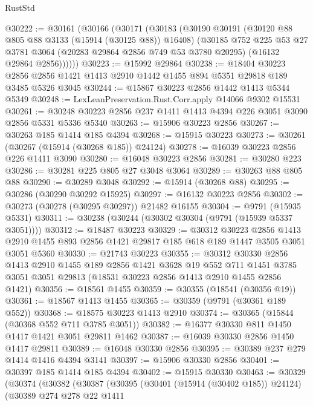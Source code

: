 \begin{lexlean}{RustStd}
\begin{coremodule}
@30222 := @30161
    (@30166
      (@30171
        (@30183
          (@30190
            @30191
            (@30120 @88 @805 @88 @3133 (@15914 (@30125 @88)) @16408)
            (@30185
              @752
              @225
              @53
              @27
              @3781
              @3064
              (@20283 @29864 @2856 @749 @53 @3780 @20295)
              (@16132 @29864 @2856))))))
@30223 := @15992 @29864
@30238 := @18404
    @30223
    @2856
    @2856
    @1421
    @1413
    @2910
    @1442
    @1455
    @894
    @5351
    @29818
    @189
    @3485
    @5326
    @3045
@30244 := @15867 @30223 @2856 @1442 @1413 @5344 @5349
@30248 := LexLeanPreservation.Rust.Corr.apply @14066 @9302 @15531
@30261 := @30248 @30223 @2856 @237 @1411 @1413 @4394 @226 @3051 @3090 @2856 @5331 @5336 @5340
@30263 := @15906 @30223 @2856
@30267 := @30263 @185 @1414 @185 @4394
@30268 := @15915 @30223
@30273 := @30261 (@30267 (@15914 (@30268 @185)) @24124)
@30278 := @16039 @30223 @2856 @226 @1411 @3090
@30280 := @16048 @30223 @2856
@30281 := @30280 @223
@30286 := @30281 @225 @805 @27 @3048 @3064
@30289 := @30263 @88 @805 @88
@30290 := @30289 @3048
@30292 := @15914 (@30268 @88)
@30295 := @30286 (@30290 @30292 @15925)
@30297 := @16132 @30223 @2856
@30302 := @30273 (@30278 (@30295 @30297)) @21482 @16155
@30304 := @9791 (@15935 @5331)
@30311 := @30238 (@30244 (@30302 @30304 (@9791 (@15939 @5337 @3051))))
@30312 := @18487 @30223
@30329 := @30312
    @30223
    @2856
    @1413
    @2910
    @1455
    @893
    @2856
    @1421
    @29817
    @185
    @618
    @189
    @1447
    @3505
    @3051
    @3051
    @5360
@30330 := @21743 @30223
@30355 := @30312
    @30330
    @2856
    @1413
    @2910
    @1455
    @189
    @2856
    @1421
    @3628
    @19
    @552
    @711
    @1451
    @3785
    @3051
    @3051
    @29813
    (@18531 @30223 @2856 @1413 @2910 @1455 @2856 @1421)
@30356 := @18561 @1455
@30359 := @30355 (@18541 (@30356 @19))
@30361 := @18567 @1413 @1455
@30365 := @30359 (@9791 (@30361 @189 @552))
@30368 := @18575 @30223 @1413 @2910
@30374 := @30365 (@15844 (@30368 @552 @711 @3785 @3051))
@30382 := @16377 @30330 @811 @1450 @1417 @1421 @3051 @29811 @1462
@30387 := @16039 @30330 @2856 @1450 @1417 @29811
@30389 := @16048 @30330 @2856
@30395 := @30389 @237 @279 @1414 @1416 @4394 @3141
@30397 := @15906 @30330 @2856
@30401 := @30397 @185 @1414 @185 @4394
@30402 := @15915 @30330
@30463 := @30329
    (@30374
      (@30382
        (@30387
          (@30395
            (@30401 (@15914 (@30402 @185)) @24124)
            (@30389
              @274
              @278
              @22
              @1411

\end{coremodule}
\end{lexlean}
